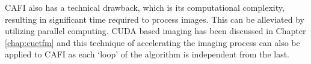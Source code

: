 CAFI also has a technical drawback, which is its computational complexity, resulting in significant time required to process images. This can be alleviated by utilizing parallel computing. CUDA based imaging has been discussed in Chapter \ref{chap:cuetfm} and this technique of accelerating the imaging process can also be applied to CAFI as each `loop' of the algorithm is independent from the last.







